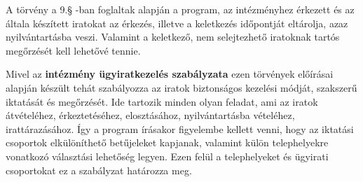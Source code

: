 \documentclass[
]{thesis-ekf}
\theoremstyle{definition}
\theoremstyle{remark}
\begin{document}
A törvény a 9.§ -ban foglaltak alapján a program, az intézményhez érkezett és az általa készített iratokat az érkezés, illetve a keletkezés időpontját eltárolja, azaz nyilvántartásba veszi. Valamint a keletkező, nem selejtezhető iratoknak tartós megőrzését kell lehetővé tennie.

Mivel az \textbf{intézmény ügyiratkezelés szabályzata} ezen törvények előírásai alapján készült tehát szabályozza az iratok biztonságos kezelési módját, szakszerű iktatását és megőrzését. Ide tartozik minden olyan feladat, ami az iratok átvételéhez, érkeztetéséhez, elosztásához, nyilvántartásba vételéhez, irattárazásához. Így a program írásakor figyelembe kellett venni, hogy az iktatási csoportok elkülöníthető betűjeleket kapjanak, valamint külön telephelyekre vonatkozó választási lehetőség legyen. Ezen felül a telephelyeket és ügyirati csoportokat ez a szabályzat határozza meg. 
\end{document}
